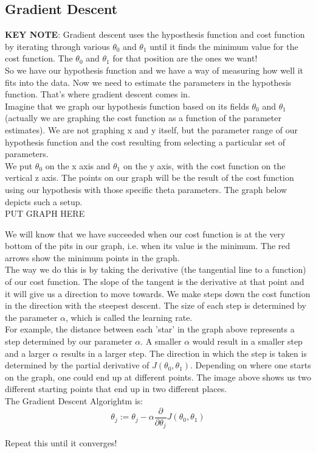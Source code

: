 \subsection{Gradient Descent}

\textbf{KEY NOTE}: Gradient descent uses the hyposthesis function and cost function by iterating through various $\theta_0$ and $ \theta_1$ until it finds the minimum value for the cost function.  The $\theta_0$ and $ \theta_1$ for that position are the ones we want!\\

So we have our hypothesis function and we have a way of measuring how well it fits into the data. Now we need to estimate the parameters in the hypothesis function. That's where gradient descent comes in. \\

Imagine that we graph our hypothesis function based on its fields $\theta_0$ and $ \theta_1$ (actually we are graphing the cost function as a function of the parameter estimates). We are not graphing x and y itself, but the parameter range of our hypothesis function and the cost resulting from selecting a particular set of parameters. \\

We put $\theta_0$ on the x axis and $\theta_1$ on the y axis, with the cost function on the vertical z axis. The points on our graph will be the result of the cost function using our hypothesis with those specific theta parameters. The graph below depicts such a setup.\\

PUT GRAPH HERE

We will know that we have succeeded when our cost function is at the very bottom of the pits in our graph, i.e. when its value is the minimum. The red arrows show the minimum points in the graph.\\

The way we do this is by taking the derivative (the tangential line to a function) of our cost function. The slope of the tangent is the derivative at that point and it will give us a direction to move towards. We make steps down the cost function in the direction with the steepest descent. The size of each step is determined by the parameter $\alpha$, which is called the learning rate.\\

For example, the distance between each 'star' in the graph above represents a step determined by our parameter $\alpha$. A smaller $\alpha$ would result in a smaller step and a larger $\alpha$ results in a larger step. The direction in which the step is taken is determined by the partial derivative of $J(\theta_0,\theta_1)$. Depending on where one starts on the graph, one could end up at different points. The image above shows us two different starting points that end up in two different places. \\

The Gradient Descent Algorightm is:
\begin{equation}
  \theta_j := \theta_j - \alpha \frac{\partial}{\partial \theta_j} J(\theta_0, \theta_1)
\end{equation}

Repeat this until it converges!
